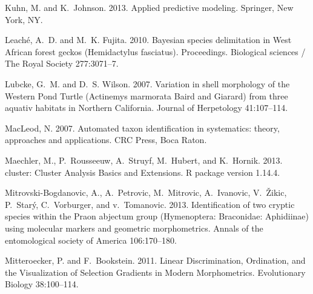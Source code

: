 \documentclass[12pt,letterpaper]{article}
\begin{document}
\begin{thebibliography}{77}
        Kuhn, M. and K.~Johnson. 2013. {Applied predictive modeling}. Springer, New
        York, NY.

        Leach\'{e}, A.~D. and M.~K. Fujita. 2010. {Bayesian species delimitation in
        West African forest geckos (Hemidactylus fasciatus).} Proceedings. Biological
        sciences / The Royal Society 277:3071--7.

        Lubcke, G.~M. and D.~S. Wilson. 2007. {Variation in shell morphology of the
          Western Pond Turtle (Actinemys marmorata Baird and Giarard) from three
        aquativ habitats in Northern California}. Journal of Herpetology 41:107--114.

        MacLeod, N. 2007. {Automated taxon identification in systematics: theory,
        approaches and applications}. CRC Press, Boca Raton.

        Maechler, M., P.~Rousseeuw, A.~Struyf, M.~Hubert, and K.~Hornik. 2013. cluster:
        Cluster Analysis Basics and Extensions. R package version 1.14.4.

        Mitrovski-Bogdanovic, A., A.~Petrovic, M.~Mitrovic, A.~Ivanovic, V.~\v{Z}ikic,
        P.~Star\'{y}, C.~Vorburger, and v.~Tomanovic. 2013. {Identification of two
          cryptic species within the Praon abjectum group (Hymenoptera: Braconidae:
        Aphidiinae) using molecular markers and geometric morphometrics}. Annals of
        the entomological society of America 106:170--180.

        Mitteroecker, P. and F.~Bookstein. 2011. {Linear Discrimination, Ordination,
        and the Visualization of Selection Gradients in Modern Morphometrics}.
        Evolutionary Biology 38:100--114.


\end{thebibliography}
\end{document}
